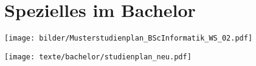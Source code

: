 \newpage
\section{Spezielles im Bachelor}
\label{bachelor}




\begin{minipage}{1.0\linewidth}
	\begin{center}     
		\label{musterstudienplan}
		\texttt{[image: bilder/Musterstudienplan\_BScInformatik\_WS\_02.pdf]}
	\end{center}  
\end{minipage}
\newpage
\begin{minipage}{1.0\linewidth}
	\begin{center} 
  		\texttt{[image: texte/bachelor/studienplan\_neu.pdf]}
  		\label{studienplan_neu}
	\end{center}
\end{minipage}

